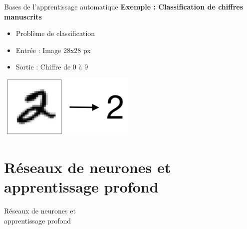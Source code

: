 \documentclass[french]{beamer}
\begin{document}
\begin{frame}{Bases de l'apprentissage automatique}
\vspace{0.5cm}
\textbf{Exemple : Classification de chiffres manuscrits \cite{lecun1998mnist}}
\begin{itemize}
	\item Problème de classification
	\item Entrée : Image 28x28 px
	\item Sortie : Chiffre de 0 à 9
\end{itemize}
\vspace{0.5cm}
\begin{center}
\includegraphics[height=3cm]{figures/mnist-2}
\end{center}
\end{frame}



\section{Réseaux de neurones et apprentissage profond}

\begin{frame}{}
\centering
{\Huge Réseaux de neurones et \\ apprentissage profond}
\end{frame}
\end{document}
